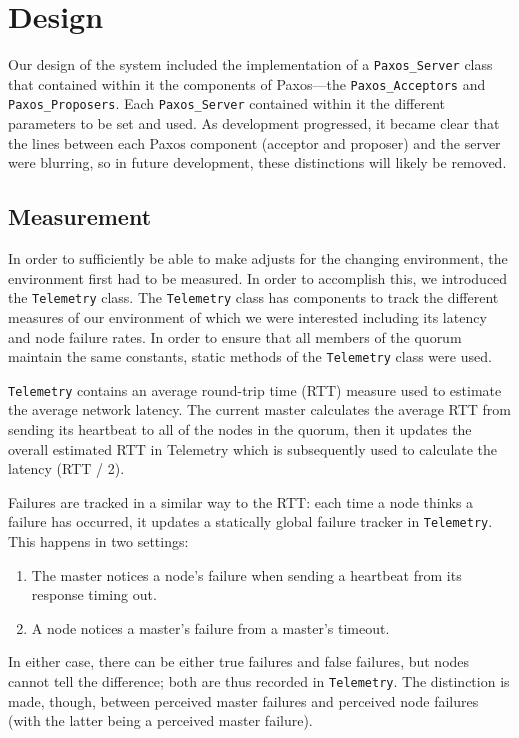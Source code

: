 
\section{Design}
Our design of the system included the implementation of a \texttt{Paxos\_Server} class that contained within it the components of Paxos---the \texttt{Paxos\_Acceptors} and \texttt{Paxos\_Proposers}.  Each \texttt{Paxos\_Server} contained within it the different parameters to be set and used.  As development progressed, it became clear that the lines between each Paxos component (acceptor and proposer) and the server were blurring, so in future development, these distinctions will likely be removed.
\subsection{Measurement}
In order to sufficiently be able to make adjusts for the changing environment, the environment first had to be measured.  In order to accomplish this, we introduced the \texttt{Telemetry} class.  The \texttt{Telemetry} class has components to track the different measures of our environment of which we were interested including its latency and node failure rates.  In order to ensure that all members of the quorum maintain the same constants, static methods of the \texttt{Telemetry} class were used.

\texttt{Telemetry} contains an average round-trip time (RTT) measure used to estimate the average network latency.  The current master calculates the average RTT from sending its heartbeat to all of the nodes in the quorum, then it updates the overall estimated RTT in Telemetry which is subsequently used to calculate the latency (RTT / 2). %

Failures are tracked in a similar way to the RTT: each time a node thinks a failure has occurred, it updates a statically global failure tracker in \texttt{Telemetry}.  This happens in two settings:
\begin{enumerate}
	\item The master notices a node's failure when sending a heartbeat from its response timing out.
	\item A node notices a master's failure from a master's timeout.
\end{enumerate}
In either case, there can be either true failures and false failures, but nodes cannot tell the difference; both are thus recorded in \texttt{Telemetry}.  The distinction is made, though, between perceived master failures and perceived node failures (with the latter being a perceived master failure).

